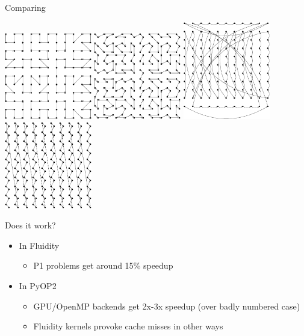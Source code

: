 \documentclass[presentation]{beamer}
\begin{document}
\begin{frame}[label={sec:orgheadline8}]{Comparing}
\begin{center}
\includegraphics[width=3.8cm]{03-18-FEniCS-mesh-numbering.figures/good-nodes}\hspace{2em}
\includegraphics[width=3.8cm]{03-18-FEniCS-mesh-numbering.figures/good-elements}\vspace{1em}
\includegraphics[width=3.8cm]{03-18-FEniCS-mesh-numbering.figures/bad-nodes}\hspace{2em}
\includegraphics[width=3.8cm]{03-18-FEniCS-mesh-numbering.figures/bad-elements}
\end{center}
\end{frame}

\begin{frame}[label={sec:orgheadline9}]{Does it work?}
\begin{itemize}
\item In Fluidity
\begin{itemize}
\item P1 problems get around 15\% speedup
\end{itemize}
\item In PyOP2
\begin{itemize}
\item GPU/OpenMP backends get 2x-3x speedup (over badly numbered case)
\item Fluidity kernels provoke cache misses in other ways
\end{itemize}
\end{itemize}
\end{frame}
\end{document}
